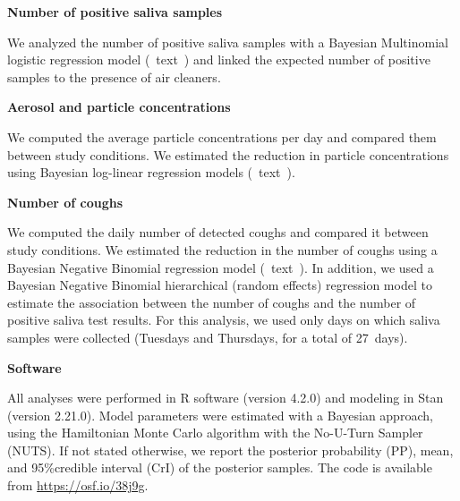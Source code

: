 \documentclass[fleqn,11pt]{wlscirep}
\begin{document}
\noindent\textbf{Number of positive saliva samples} \smallskip

\noindent We analyzed the number of positive saliva samples with a Bayesian Multinomial logistic regression model (\supp~text~) and linked the expected number of positive samples to the presence of air cleaners. \medskip %

\noindent\textbf{Aerosol and particle concentrations} \smallskip

\noindent We computed the average particle concentrations per day and compared them between study conditions. We estimated the reduction in particle concentrations using Bayesian log-linear regression models (\supp~text~). \medskip %

\noindent\textbf{Number of coughs} \smallskip

\noindent We computed the daily number of detected coughs and compared it between study conditions. We estimated the reduction in the number of coughs using a Bayesian Negative Binomial regression model (\supp~text~). %
In addition, we used a Bayesian Negative Binomial hierarchical (random effects) regression model to estimate the association between the number of coughs and the number of positive saliva test results. For this analysis, we used only days on which saliva samples were collected (Tuesdays and Thursdays, for a total of 27~days).  \medskip

\noindent\textbf{Software} \smallskip

\noindent All analyses were performed in R software (version 4.2.0)\cite{RCoreTeam2022} and modeling in Stan (version 2.21.0)\cite{Carpenter2017}. Model parameters were estimated with a Bayesian approach, using the Hamiltonian Monte Carlo algorithm with the No-U-Turn Sampler (NUTS)\cite{Hoffman2014}. %
If not stated otherwise, we report the posterior probability (PP), mean, and 95\%credible interval (CrI) of the posterior samples. The code is available from \url{https://osf.io/38j9g}.
\end{document}

